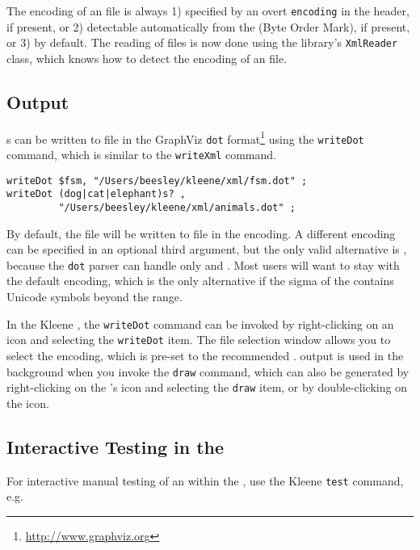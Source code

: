 The encoding of an
 file is always 1) specified by an overt \texttt{encoding} in
the  header, if present, or 2) detectable automatically from the
 (Byte Order Mark), if present, or 3)  by default.
The reading of  files is now done using the  library's
\texttt{XmlReader} class, which knows how to detect the encoding of an
 file.

\subsection{ Output}

\fsm{}s can be written to file in the GraphViz \verb!dot!
format\footnote{\url{http://www.graphviz.org}} using the
\texttt{writeDot} command, which is similar to the \texttt{writeXml} command.

\begin{Verbatim}
writeDot $fsm, "/Users/beesley/kleene/xml/fsm.dot" ;
writeDot (dog|cat|elephant)s? , 
         "/Users/beesley/kleene/xml/animals.dot" ;
\end{Verbatim}

By default, the file will be written to file in the 
encoding.  A different encoding can be specified in an optional third
argument, but the only valid alternative is , because
the \verb!dot! parser can handle only  and .
Most users will want to stay with the default  encoding,
which is the only alternative if the sigma of the \fsm{} contains
Unicode symbols beyond the  range.

In the Kleene , the \verb!writeDot! command can be invoked by
right-clicking on an \fsm{} icon and selecting the \verb!writeDot! item.
The file selection window allows you to select the encoding, which is
pre-set to the recommended .   output is used in the
background when you invoke the \texttt{draw} command, which can also be
generated by right-clicking on the \fsm{}'s icon and selecting the \texttt{draw} item, or
by double-clicking on the icon.

\subsection{Interactive Testing in the }

For interactive manual testing of an \fsm{} within the ,
use the Kleene \texttt{test} command, e.g.

